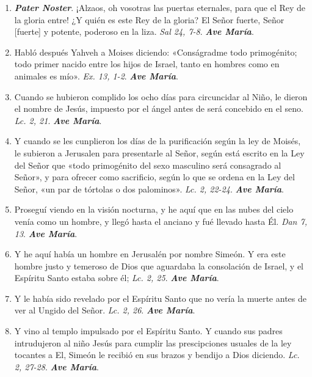 \documentclass[11pt,a4paper]{book}
\begin{document}
    \begin{enumerate}
        \item \textbf{\emph{Pater Noster}}. ¡Alzaos, oh vosotras las puertas eternales, para que el Rey de la gloria entre!
            ¿Y quién es este Rey de la gloria? El Señor fuerte, Señor [fuerte] y potente, poderoso en la liza. \emph{Sal 24, 7-8}. \textbf{\emph{Ave María}}.

        \item Habló después Yahveh a Moises diciendo: «Conságradme todo primogénito; todo primer nacido entre los hijos de Israel, tanto en hombres como en animales es mío». 
            \emph{Ex. 13, 1-2}. \textbf{\emph{Ave María}}.

        \item Cuando se hubieron complido los ocho días para circuncidar al Niño, le dieron el nombre de Jesús, impuesto por el ángel antes de será concebido en el seno. 
            \emph{Lc. 2, 21}. \textbf{\emph{Ave María}}.

        \item Y cuando se les cunplieron los días de la purificación según la ley de Moisés, le subieron a Jerusalen para presentarle al Señor, 
            según está escrito en la Ley del Señor que «todo primogénito del sexo masculino será consagrado al Señor», 
            y para ofrecer como sacrificio, según lo que se ordena en la Ley del Señor, «un par de tórtolas o dos palominos». \emph{Lc. 2, 22-24}. \textbf{\emph{Ave María}}.

        \item Proseguí viendo en la visión nocturna, y he aquí que en las nubes del cielo venía como un hombre, y llegó hasta el anciano y fué llevado hasta Él. 
            \emph{Dan 7, 13}. \textbf{\emph{Ave María}}.

        \item Y he aquí había un hombre en Jerusalén por nombre Simeón. Y era este hombre justo y temeroso de Dios que aguardaba la consolación de Israel, 
            y el Espíritu Santo estaba sobre él; \emph{Lc. 2, 25}. \textbf{\emph{Ave María}}.

        \item Y le había sido revelado por el Espíritu Santo que no vería la muerte antes de ver al Ungido del Señor. \emph{Lc. 2, 26}. \textbf{\emph{Ave María}}.

        \item Y vino al templo impulsado por el Espíritu Santo. Y cuando sus padres intrudujeron al niño Jesús para cumplir 
            las prescipciones usuales de la ley tocantes a El, Simeón le recibió en sus brazos y bendijo a Dios diciendo. \emph{Lc. 2, 27-28}. \textbf{\emph{Ave María}}.


\end{enumerate}
\end{document}
